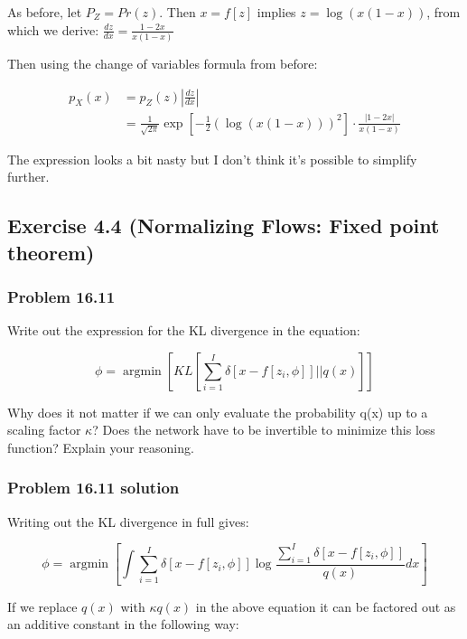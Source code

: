 \documentclass[
10pt, %
a4paper, %
oneside, %
headinclude,footinclude, %
BCOR5mm, %
]{scrartcl}
\DeclareMathOperator*{\argmin}{argmin} %
\begin{document}
As before, let $P_Z = Pr(z)$. Then $x = f[z]$ implies $z = \log(x(1-x))$, from which we derive: $\frac{dz}{dx} = \frac{1-2x}{x(1-x)}$

Then using the change of variables formula from before:

\begin{align*}
  p_X(x) &= p_Z(z) \left|\frac{dz}{dx}\right| \\
  &= \frac{1}{\sqrt{2\pi}} \exp \left[-\frac{1}{2}(\log(x(1-x)))^2 \right] \cdot \frac{|1-2x|}{x(1-x)}
\end{align*}

The expression looks a bit nasty but I don't think it's possible to simplify further.

\newpage

\subsection*{Exercise 4.4 (Normalizing Flows: Fixed point theorem)}

\subsubsection*{Problem 16.11}

Write out the expression for the KL divergence in the equation:

\begin{equation*}
  \phi = \argmin \left[ KL \left[ \sum_{i=1}^I \delta[x-f[z_i,\phi]] || q(x) \right] \right]
\end{equation*}

Why does it not matter if we can only evaluate the probability q(x) up to a scaling factor $\kappa$? Does the network have to be invertible to minimize this loss function? Explain your reasoning.

\subsubsection*{Problem 16.11 solution}

Writing out the KL divergence in full gives:

\begin{equation*}
  \phi = \argmin \left[ \int \sum_{i=1}^I \delta[x-f[z_i,\phi]] \log \frac{\sum_{i=1}^I \delta[x-f[z_i,\phi]]}{q(x)} dx \right]
\end{equation*}

If we replace $q(x)$ with $\kappa q(x)$ in the above equation it can be factored out as an additive constant in the following way:
\end{document}
